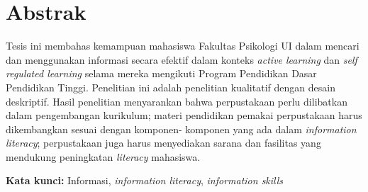 %
%
%

\chapter*{Abstrak}



\begin{singlespace} %
{

	Tesis ini membahas kemampuan mahasiswa Fakultas Psikologi UI dalam mencari dan
	menggunakan informasi secara efektif dalam konteks \textit{active learning} dan \textit{self regulated
	learning} selama mereka mengikuti Program Pendidikan Dasar Pendidikan Tinggi.
	Penelitian ini adalah penelitian kualitatif dengan desain deskriptif. Hasil penelitian
	menyarankan bahwa perpustakaan perlu dilibatkan dalam pengembangan kurikulum;
	materi pendidikan pemakai perpustakaan harus dikembangkan sesuai dengan komponen-
	komponen yang ada dalam \textit{information literacy}; perpustakaan juga harus menyediakan
	sarana dan fasilitas yang mendukung peningkatan \textit{literacy} mahasiswa.
	
    \vspace{1.5em}

	\noindent \textbf{Kata kunci:} Informasi, \textit{information literacy}, \textit{information skills}
}
\end{singlespace}
